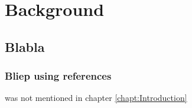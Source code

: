 \chapter{Background}
\label{chapt:Background}

\section{Blabla}
\subsection{Bliep using references}

\cite{Demeyer2008} was not mentioned in chapter \ref{chapt:Introduction}